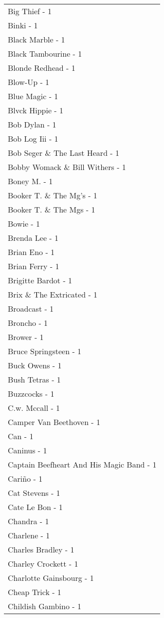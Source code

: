 \documentclass[
]{article}
\begin{document}
\begin{longtable}{l}
Big Thief - 1 \\ 
Binki - 1 \\ 
Black Marble - 1 \\ 
Black Tambourine - 1 \\ 
Blonde Redhead - 1 \\ 
Blow-Up - 1 \\ 
Blue Magic - 1 \\ 
Blvck Hippie - 1 \\ 
Bob Dylan - 1 \\ 
Bob Log Iii - 1 \\ 
Bob Seger \& The Last Heard - 1 \\ 
Bobby Womack \& Bill Withers - 1 \\ 
Boney M. - 1 \\ 
Booker T. \& The Mg's - 1 \\ 
Booker T. \& The Mgs - 1 \\ 
Bowie - 1 \\ 
Brenda Lee - 1 \\ 
Brian Eno - 1 \\ 
Brian Ferry - 1 \\ 
Brigitte Bardot - 1 \\ 
Brix \& The Extricated - 1 \\ 
Broadcast - 1 \\ 
Broncho - 1 \\ 
Brower - 1 \\ 
Bruce Springsteen - 1 \\ 
Buck Owens - 1 \\ 
Bush Tetras - 1 \\ 
Buzzcocks - 1 \\ 
C.w. Mccall - 1 \\ 
Camper Van Beethoven - 1 \\ 
Can - 1 \\ 
Caninus - 1 \\ 
Captain Beefheart And His Magic Band - 1 \\ 
Cariño - 1 \\ 
Cat Stevens - 1 \\ 
Cate Le Bon - 1 \\ 
Chandra - 1 \\ 
Charlene - 1 \\ 
Charles Bradley - 1 \\ 
Charley Crockett - 1 \\ 
Charlotte Gainsbourg - 1 \\ 
Cheap Trick - 1 \\ 
Childish Gambino - 1 \\ 

\end{longtable}
\end{document}

